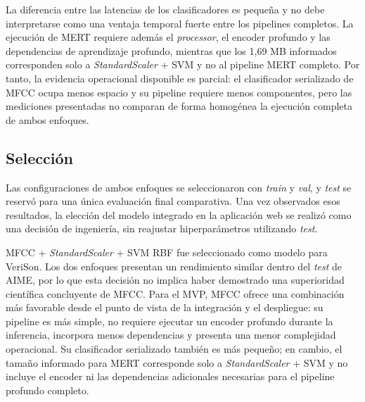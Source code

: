 La diferencia entre las latencias de los clasificadores es pequeña y no debe interpretarse como una ventaja temporal fuerte entre los pipelines completos. La ejecución de MERT requiere además el \textit{processor}, el encoder profundo y las dependencias de aprendizaje profundo, mientras que los 1,69 MB informados corresponden solo a \textit{StandardScaler} + SVM y no al pipeline MERT completo. Por tanto, la evidencia operacional disponible es parcial: el clasificador serializado de MFCC ocupa menos espacio y su pipeline requiere menos componentes, pero las mediciones presentadas no comparan de forma homogénea la ejecución completa de ambos enfoques.

\subsection*{Selección}

Las configuraciones de ambos enfoques se seleccionaron con \textit{train} y \textit{val}, y \textit{test} se reservó para una única evaluación final comparativa. Una vez observados esos resultados, la elección del modelo integrado en la aplicación web se realizó como una decisión de ingeniería, sin reajustar hiperparámetros utilizando \textit{test}.

MFCC + \textit{StandardScaler} + SVM RBF fue seleccionado como modelo para VeriSon. Los dos enfoques presentan un rendimiento similar dentro del \textit{test} de AIME, por lo que esta decisión no implica haber demostrado una superioridad científica concluyente de MFCC. Para el MVP, MFCC ofrece una combinación más favorable desde el punto de vista de la integración y el despliegue: su pipeline es más simple, no requiere ejecutar un encoder profundo durante la inferencia, incorpora menos dependencias y presenta una menor complejidad operacional. Su clasificador serializado también es más pequeño; en cambio, el tamaño informado para MERT corresponde solo a \textit{StandardScaler} + SVM y no incluye el encoder ni las dependencias adicionales necesarias para el pipeline profundo completo.
